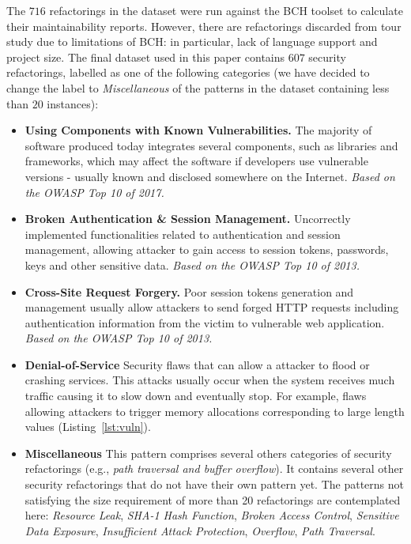 \documentclass[10pt,conference]{IEEEtran}
\begin{document}
The $716$ refactorings in the dataset were run against the BCH toolset to
calculate their maintainability reports. However, there are refactorings
discarded from tour study due to limitations of BCH: in particular, lack of
language support and project size. The final dataset used in this paper contains
$607$ security refactorings, labelled as one of the following categories (we
have decided to change the label to \textit{Miscellaneous} of the patterns in
the dataset containing less than $20$ instances):

\begin{itemize}
	\item \textbf{Using Components with Known Vulnerabilities.} The majority of
	software produced today integrates several components, such as libraries and
	frameworks, which may affect the software if developers use vulnerable
	versions - usually known and disclosed somewhere on the Internet.
	\textit{Based on the OWASP Top 10 of 2017.}

	\item \textbf{Broken Authentication \& Session Management.} Uncorrectly
	implemented functionalities related to authentication and session management,
	allowing attacker to gain access to session tokens, passwords, keys and other
	sensitive data. \textit{Based on the OWASP Top 10 of 2013.}

	\item \textbf{Cross-Site Request Forgery.} Poor session tokens generation and
	management usually allow attackers to send forged HTTP requests including
	authentication information from the victim to vulnerable web application.
	\textit{Based on the OWASP Top 10 of 2013.}

	\item \textbf{Denial-of-Service} Security flaws that can allow a attacker to
	flood or crashing services. This attacks usually occur when the system
	receives much traffic causing it to slow down and eventually stop. For
	example, flaws allowing attackers to trigger memory allocations corresponding
	to large length values (Listing~\ref{lst:vuln}).

	\item \textbf{Miscellaneous} This pattern comprises several others categories
	of security refactorings (e.g., \textit{path traversal and buffer overflow}).
	It contains several other security refactorings that do not have their own
	pattern yet. The patterns not satisfying the size requirement of more than 20
	refactorings are contemplated here: \textit{Resource Leak},
	\textit{SHA-1 Hash Function}, \textit{Broken Access Control}, \textit{Sensitive Data Exposure},
	\textit{Insufficient Attack Protection}, \textit{Overflow}, \textit{Path Traversal}.


\end{itemize}
\end{document}
